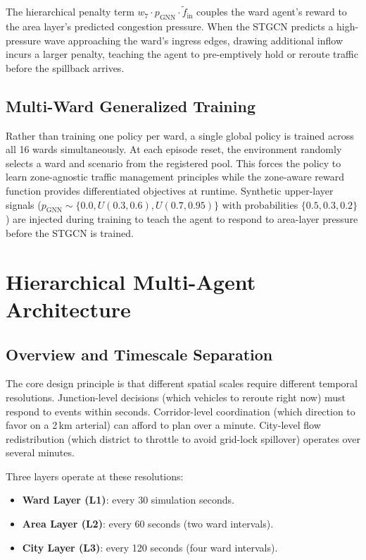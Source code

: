 \documentclass[conference]{IEEEtran}
\begin{document}
The hierarchical penalty term $w_7 \cdot p_{\text{GNN}} \cdot \tilde{f}_{\text{in}}$
couples the ward agent's reward to the area layer's predicted congestion pressure.
When the STGCN predicts a high-pressure wave approaching the ward's ingress edges,
drawing additional inflow incurs a larger penalty, teaching the agent to pre-emptively
hold or reroute traffic before the spillback arrives.

\subsection{Multi-Ward Generalized Training}

Rather than training one policy per ward, a single global policy is trained
across all 16 wards simultaneously. At each episode reset, the environment
randomly selects a ward and scenario from the registered pool. This forces
the policy to learn zone-agnostic traffic management principles while the
zone-aware reward function provides differentiated objectives at runtime.
Synthetic upper-layer signals ($p_{\text{GNN}} \sim \{0.0, U(0.3, 0.6),
U(0.7, 0.95)\}$ with probabilities $\{0.5, 0.3, 0.2\}$) are injected
during training to teach the agent to respond to area-layer pressure before
the STGCN is trained.

\section{Hierarchical Multi-Agent Architecture}
\label{sec:arch}

\subsection{Overview and Timescale Separation}

The core design principle is that different spatial scales require different
temporal resolutions. Junction-level decisions (which vehicles to reroute
right now) must respond to events within seconds. Corridor-level coordination
(which direction to favor on a 2\,km arterial) can afford to plan over a
minute. City-level flow redistribution (which district to throttle to avoid
grid-lock spillover) operates over several minutes.

Three layers operate at these resolutions:

\begin{itemize}
\item \textbf{Ward Layer (L1)}: every 30 simulation seconds.
\item \textbf{Area Layer (L2)}: every 60 seconds (two ward intervals).
\item \textbf{City Layer (L3)}: every 120 seconds (four ward intervals).
\end{itemize}
\end{document}
